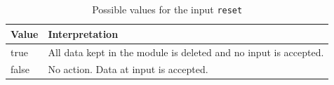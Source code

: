 \documentclass{template/openetcs_report}
\begin{document}
\begin{table}[H]
  \begin{tabular}{| l | p{9cm} |}
    \hline
    \textbf{Value} & \textbf{Interpretation}\\ \hline
    true & All data kept in the module is deleted and no input is accepted.\\
    false & No action. Data at input is accepted.\\
    \hline
  \end{tabular} 
  \caption{Possible values for the input \texttt{reset}}
  \label{tbl:reset}
\end{table}

%  
%  
%  
%  
 


\end{document}
